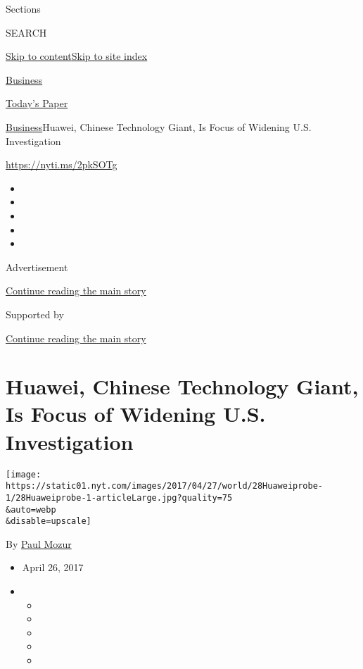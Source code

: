 Sections

SEARCH

\protect\hyperlink{site-content}{Skip to
content}\protect\hyperlink{site-index}{Skip to site index}

\href{https://www.nytimes.com/section/business}{Business}

\href{https://myaccount.nytimes.com/auth/login?response_type=cookie\&client_id=vi}{}

\href{https://www.nytimes.com/section/todayspaper}{Today's Paper}

\href{/section/business}{Business}\textbar{}Huawei, Chinese Technology
Giant, Is Focus of Widening U.S. Investigation

\url{https://nyti.ms/2pkSOTg}

\begin{itemize}
\item
\item
\item
\item
\item
\end{itemize}

Advertisement

\protect\hyperlink{after-top}{Continue reading the main story}

Supported by

\protect\hyperlink{after-sponsor}{Continue reading the main story}

\hypertarget{huawei-chinese-technology-giant-is-focus-of-widening-us-investigation}{%
\section{Huawei, Chinese Technology Giant, Is Focus of Widening U.S.
Investigation}\label{huawei-chinese-technology-giant-is-focus-of-widening-us-investigation}}

\texttt{[image: https://static01.nyt.com/images/2017/04/27/world/28Huaweiprobe-1/28Huaweiprobe-1-articleLarge.jpg?quality=75\\\&auto=webp\\\&disable=upscale]}

By \href{https://www.nytimes.com/by/paul-mozur}{Paul Mozur}

\begin{itemize}
\item
  April 26, 2017
\item
  \begin{itemize}
  \item
  \item
  \item
  \item
  \item
  \end{itemize}
\end{itemize}

